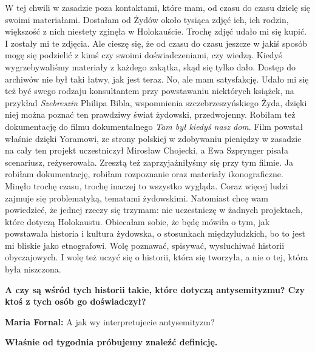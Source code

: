 W tej chwili w zasadzie poza kontaktami, które mam, od czasu do czasu dzielę się swoimi materiałami. Dostałam od Żydów około tysiąca zdjęć ich, ich rodzin, większość z nich niestety zginęła w Holokauście. Trochę zdjęć udało mi się kupić. I zostały mi te zdjęcia. Ale cieszę się, że od czasu do czasu jeszcze w jakiś sposób mogę się podzielić z kimś czy swoimi doświadczeniami, czy wiedzą. Kiedyś wygrzebywaliśmy materiały z każdego zakątka, skąd się tylko dało. Dostęp do archiwów nie był taki łatwy, jak jest teraz. No, ale mam satysfakcję. Udało mi się też być swego rodzaju konsultantem przy powstawaniu niektórych książek, na przykład \textit{Szebreszin} Philipa Bibla, wspomnienia szczebrzeszyńskiego Żyda, dzięki niej można poznać ten prawdziwy świat żydowski, przedwojenny. Robiłam też dokumentację do filmu dokumentalnego \textit{Tam był kiedyś nasz dom}. Film powstał właśnie dzięki Yoramowi, ze strony polskiej w zdobywaniu pieniędzy w zasadzie na cały ten projekt uczestniczył Mirosław Chojecki, a Ewa Szprynger pisała scenariusz, reżyserowała. Zresztą też zaprzyjaźniłyśmy się przy tym filmie. Ja robiłam dokumentację, robiłam rozpoznanie oraz materiały ikonograficzne. Minęło trochę czasu, trochę inaczej to wszystko wygląda. Coraz więcej ludzi zajmuje się problematyką, tematami żydowskimi. Natomiast chcę wam powiedzieć, że jednej rzeczy się trzymam: nie uczestniczę w żadnych projektach, które dotyczą Holokaustu. Obiecałam sobie, że będę mówiła o tym, jak powstawała historia i kultura żydowska, o stosunkach międzyludzkich, bo to jest mi bliskie jako etnografowi. Wolę poznawać, spisywać, wysłuchiwać historii obyczajowych. I wolę też uczyć się o historii, która się tworzyła, a nie o tej, która była niszczona. 

\textbf{A czy są wśród tych historii takie, które dotyczą antysemityzmu? Czy ktoś z tych osób go doświadczył?}
 
\textbf{Maria Fornal:} A jak wy interpretujecie antysemityzm?

\textbf{Właśnie od tygodnia próbujemy znaleźć definicję.}

